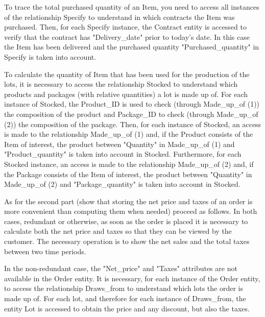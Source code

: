 To trace the total purchased quantity of an Item, you need to access all instances of the relationship Specify to understand in which contracts the Item was purchased. Then, for each Specify instance, the Contract entity is accessed to verify that the contract has "Delivery\_date" prior to today's date. In this case the Item has been delivered and the purchased quantity "Purchased\_quantity" in Specify is taken into account.

To calculate the quantity of Item that has been used for the production of the lots, it is necessary to access the relationship Stocked to understand which products and packages (with relative quantities) a lot is made up of. For each instance of Stocked, the Product\_ID is used to check (through Made\_up\_of (1)) the composition of the product and Package\_ID to check (through Made\_up\_of (2)) the composition of the package. Then, for each instance of Stocked, an access is made to the relationship Made\_up\_of (1) and, if the Product consists of the Item of interest, the product between "Quantity" in Made\_up\_of (1) and "Product\_quantity" is taken into account in Stocked. Furthermore, for each Stocked instance, an access is made to the relationship Made\_up\_of (2) and, if the Package consists of the Item of interest, the product between "Quantity" in Made\_up\_of (2) and "Package\_quantity" is taken into account in Stocked.

As for the second part (show that storing the net price and taxes of an order is more convenient than computing them when needed) proceed as follows.
In both cases, redundant or otherwise, as soon as the order is placed it is necessary to calculate both the net price and taxes so that they can be viewed by the customer.
The necessary operation is to show the net sales and the total taxes between two time periods.

In the non-redundant case, the "Net\_price" and "Taxes" attributes are not available in the Order entity. It is necessary, for each instance of the Order entity, to access the relationship Draws\_from to understand which lots the order is made up of. For each lot, and therefore for each instance of Draws\_from, the entity Lot is accessed to obtain the price and any discount, but also the taxes.

